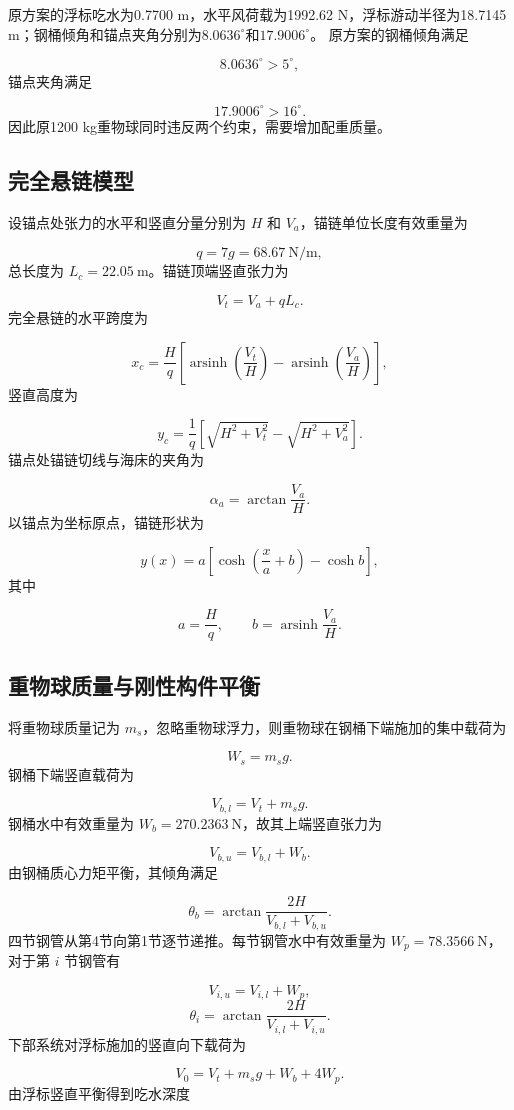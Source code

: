 原方案的浮标吃水为0.7700 m，水平风荷载为1992.62 N，浮标游动半径为18.7145 m；钢桶倾角和锚点夹角分别为$8.0636^\circ$和$17.9006^\circ$。
原方案的钢桶倾角满足

\[
8.0636^\circ>5^\circ,
\]
锚点夹角满足

\[
17.9006^\circ>16^\circ.
\]
因此原1200 kg重物球同时违反两个约束，需要增加配重质量。

\subsection{完全悬链模型}
设锚点处张力的水平和竖直分量分别为 \(H\) 和 \(V_a\)，锚链单位长度有效重量为

\[
q=7g=68.67\ \mathrm{N/m},
\]
总长度为 \(L_c=22.05\ \mathrm m\)。锚链顶端竖直张力为

\[
V_t=V_a+qL_c. \tag{2}
\]
完全悬链的水平跨度为

\[
x_c=\frac{H}{q}
\left[
\operatorname{arsinh}\left(\frac{V_t}{H}\right)
-\operatorname{arsinh}\left(\frac{V_a}{H}\right)
\right], \tag{3}
\]
竖直高度为

\[
y_c=\frac{1}{q}
\left[
\sqrt{H^2+V_t^2}-\sqrt{H^2+V_a^2}
\right]. \tag{4}
\]
锚点处锚链切线与海床的夹角为

\[
\alpha_a=\arctan\frac{V_a}{H}. \tag{5}
\]
以锚点为坐标原点，锚链形状为

\[
y(x)=a\left[
\cosh\left(\frac{x}{a}+b\right)-\cosh b
\right], \tag{6}
\]
其中

\[
a=\frac{H}{q},
\qquad
b=\operatorname{arsinh}\frac{V_a}{H}.
\]
\subsection{重物球质量与刚性构件平衡}
将重物球质量记为 \(m_s\)，忽略重物球浮力，则重物球在钢桶下端施加的集中载荷为

\[
W_s=m_sg. \tag{7}
\]
钢桶下端竖直载荷为

\[
V_{b,l}=V_t+m_sg. \tag{8}
\]
钢桶水中有效重量为 \(W_b=270.2363\ \mathrm N\)，故其上端竖直张力为

\[
V_{b,u}=V_{b,l}+W_b. \tag{9}
\]
由钢桶质心力矩平衡，其倾角满足

\[
\theta_b=\arctan
\frac{2H}{V_{b,l}+V_{b,u}}. \tag{10}
\]
四节钢管从第4节向第1节逐节递推。每节钢管水中有效重量为 \(W_p=78.3566\ \mathrm N\)，对于第 \(i\) 节钢管有

\[
V_{i,u}=V_{i,l}+W_p, \tag{11}
\]
\[
\theta_i=\arctan
\frac{2H}{V_{i,l}+V_{i,u}}. \tag{12}
\]
下部系统对浮标施加的竖直向下载荷为

\[
V_0=V_t+m_sg+W_b+4W_p. \tag{13}
\]
由浮标竖直平衡得到吃水深度

